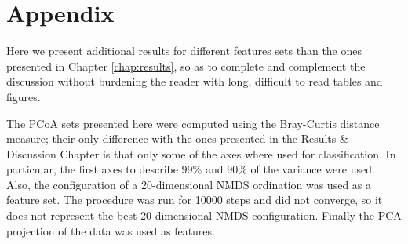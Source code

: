 \chapter{Appendix} 
\ifpdf
\graphicspath{{Chapter3/Figs/Raster/}{Chapter3/Figs/PDF/}{Chapter3/Figs/}}
\else
\graphicspath{{Chapter3/Figs/Vector/}{Chapter3/Figs/}}
\fi
Here we present additional results for different features sets than the ones presented in Chapter \ref{chap:results}, so as to complete and complement the discussion without burdening the reader with long, difficult to read tables and figures.

The PCoA sets presented here were computed using the Bray-Curtis distance measure; their only difference with the ones presented in the Results \& Discussion Chapter is that only some of the axes where used for classification. In particular, the first axes to describe 99\% and 90\% of the variance were used. Also, the configuration of a 20-dimensional NMDS ordination was used as a feature set. The procedure was run for 10000 steps and did not converge, so it does not represent the best 20-dimensional NMDS configuration. Finally the PCA projection of the data was used as features.


